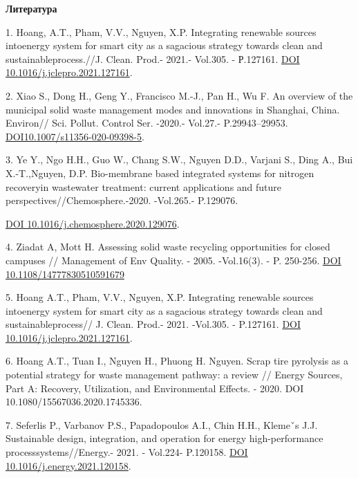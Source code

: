 \begin{center}
{\bfseries Литература}
\end{center}

\begin{references}
1. Hoang, A.T., Pham, V.V., Nguyen, X.P. Integrating renewable sources
intoenergy system for smart city as a sagacious strategy towards clean
and sustainableprocess.//J. Clean. Prod.- 2021.- Vol.305. - Р.127161.
\href{https://doi.org/10.1016/j.jclepro.2021.127161}{DOI
10.1016/j.jclepro.2021.127161}.

2. Xiao S., Dong H., Geng Y., Francisco M.-J., Pan H., Wu F. An overview
of the municipal solid waste management modes and innovations in
Shanghai, China. Environ// Sci. Pollut. Control Ser. -2020.- Vol.27.-
P.29943--29953.
\href{https://doi.org/10.1007/s11356-020-09398-5}{DOI10.1007/s11356-020-09398-5}.

3. Ye Y., Ngo H.H., Guo W., Chang S.W., Nguyen D.D., Varjani S., Ding
A., Bui X.-T.,Nguyen, D.P. Bio-membrane based integrated systems for
nitrogen recoveryin wastewater treatment: current applications and
future perspectives//Chemosphere.-2020. -Vol.265.- P.129076.

\href{https://doi.org/10.1016/j.chemosphere.2020.129076}{DOI
10.1016/j.chemosphere.2020.129076}.

4. Ziadat A, Mott H. Assessing solid waste recycling opportunities for
closed campuses // Management of Env Quality. - 2005. -Vol.16(3). - P.
250-256. \href{https://doi.org/10.1108/14777830510591679}{DOI
10.1108/14777830510591679}

5. Hoang A.T., Pham, V.V., Nguyen, X.P. Integrating renewable sources
intoenergy system for smart city as a sagacious strategy towards clean
and sustainableprocess// J. Clean. Prod.- 2021. -Vol.305. - P.127161.
\href{https://doi.org/\%2010.1016/j.jclepro.2021.127161}{DOI
10.1016/j.jclepro.2021.127161}.

6. Hoang A.T., Tuan I., Nguyen H., Phuong H. Nguyen. Scrap tire
pyrolysis as a potential strategy for waste management pathway: a review
// Energy Sources, Part A: Recovery, Utilization, and Environmental
Effects. - 2020. DOI 10.1080/15567036.2020.1745336.

7. Seferlis P., Varbanov P.S., Papadopoulos A.I., Chin H.H., Klemeˇs
J.J. Sustainable design, integration, and operation for energy
high-performance processsystems//Energy.- 2021. - Vol.224- P.120158.
\href{https://doi.org/10.1016/j.energy.2021.120158}{DOI
10.1016/j.energy.2021.120158}.


\end{references}
